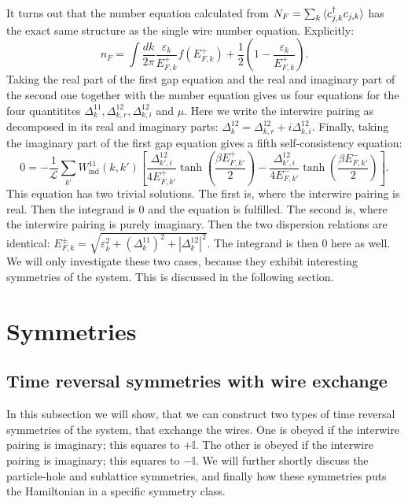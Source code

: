 It turns out that the number equation calculated from $N_F = \sum_k \braket{c^\dagger_{j,k}c_{j,k}}$ has the exact same structure as the single wire number equation. Explicitly: 
\begin{equation}
n_F = \int \frac{dk}{2\pi} \frac{\varepsilon_k}{E^{+}_{F,k}}f(E^{+}_{F,k}) + \frac{1}{2}\left(1 - \frac{\varepsilon_k}{E^{+}_{F,k}}\right). 
\label{eq.2wiresnumberequation}
\end{equation}
Taking the real part of the first gap equation and the real and imaginary part of the second one together with the number equation gives us four equations for the four quantitites $\Delta^{11}_k, \Delta^{12}_{k,r}, \Delta^{12}_{k,i} $ and $\mu$. Here we write the interwire pairing as decomposed in its real and imaginary parts: $\Delta^{12}_k = \Delta^{12}_{k,r} + i\Delta^{12}_{k,i}$. Finally, taking the imaginary part of the first gap equation gives a fifth self-consistency equation:
\begin{equation}
0 = -\frac{1}{\mathcal{L}}\sum_{k'} W_{\text{ind}}^{11}(k, k')\left[\frac{\Delta^{12}_{k',i}}{4E^{+}_{F,k'}}\tanh\left(\frac{\beta E^{+}_{F,k'}}{2}\right) - \frac{\Delta^{12}_{k',i}}{4E^{-}_{F,k'}}\tanh\left(\frac{\beta E^{-}_{F,k'}}{2}\right)\right].
\end{equation}
This equation has two trivial solutions. The first is, where the interwire pairing is real. Then the integrand is 0 and the equation is fulfilled. The second is, where the interwire pairing is purely imaginary. Then the two dispersion relations are identical: $E^{\pm}_{F,k} = \sqrt{\varepsilon_k^2 + (\Delta^{11}_k)^2 + |\Delta^{12}_k|^2}$. The integrand is then 0 here as well. We will only investigate these two cases, because they exhibit interesting symmetries of the system. This is discussed in the following section.

\section{Symmetries}
\label{sec.2wiressymmetries}
\subsection{Time reversal symmetries with wire exchange}
In this subsection we will show, that we can construct two types of time reversal symmetries of the system, that exchange the wires. One is obeyed if the interwire pairing is imaginary; this squares to $+\mathbb{I}$. The other is obeyed if the interwire pairing is imaginary; this squares to $-\mathbb{I}$. We will further shortly discuss the particle-hole and sublattice symmetries, and finally how these symmetries puts the Hamiltonian in a specific symmetry class. 

